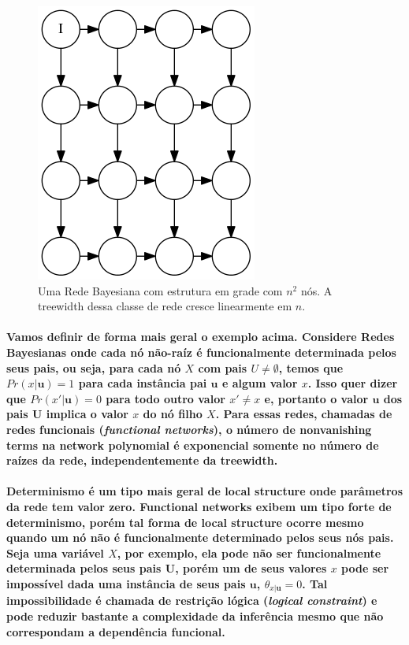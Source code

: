 \documentclass[a4paper,10pt]{article}
\theoremstyle{plain}
\begin{document}
\begin{figure}[h]
  \centering\includegraphics[scale=0.5]{imgs/grid.png}
  \caption{Uma Rede Bayesiana com estrutura em grade com $n^2$ nós. A treewidth dessa classe de
  rede cresce linearmente em $n$.}
\end{figure}

\paragraph {
  Vamos definir de forma mais geral o exemplo acima. Considere Redes Bayesianas onde cada nó
  não-raíz é funcionalmente determinada pelos seus pais, ou seja, para cada nó $X$ com pais
  $U \neq \emptyset$, temos que $Pr(x|\mathbf{u})=1$ para cada instância pai $\mathbf{u}$ e algum
  valor $x$. Isso quer dizer que $Pr(x'|\mathbf{u})=0$ para todo outro valor $x' \neq x$ e,
  portanto o valor $\mathbf{u}$ dos pais $\mathbf{U}$ implica o valor $x$ do nó filho $X$. Para
  essas redes, chamadas de redes funcionais (\textit{functional networks}), o número de
  nonvanishing terms na network polynomial é exponencial somente no número de raízes da rede,
  independentemente da treewidth.
}

\paragraph{
  Determinismo é um tipo mais geral de local structure onde parâmetros da rede tem valor zero.
  Functional networks exibem um tipo forte de determinismo, porém tal forma de local structure
  ocorre mesmo quando um nó não é funcionalmente determinado pelos seus nós pais. Seja uma variável
  $X$, por exemplo, ela pode não ser funcionalmente determinada pelos seus pais $\mathbf{U}$, porém
  um de seus valores $x$ pode ser impossível dada uma instância de seus pais $\mathbf{u}$,
  $\theta_{x|\mathbf{u}}=0$. Tal impossibilidade é chamada de restrição lógica (\textit{logical
  constraint}) e pode reduzir bastante a complexidade da inferência mesmo que não correspondam a
  dependência funcional.
}
\end{document}
